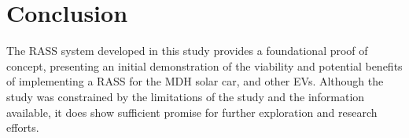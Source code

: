 \section{Conclusion}

The RASS system developed in this study provides a foundational proof of concept, presenting an initial demonstration of the viability and potential benefits of implementing a RASS for the MDH solar car, and other EVs. Although the study was constrained by the limitations of the study and the information available, it does show sufficient promise for further exploration and research efforts.

